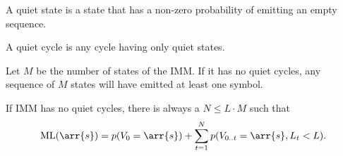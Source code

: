 \begin{definition}
  A quiet state is a state that has a non-zero probability of emitting an empty sequence.
\end{definition}

\begin{definition}
  A quiet cycle is any cycle having only quiet states.
\end{definition}

\begin{corollary}
  Let $M$ be the number of states of the IMM. If it has no quiet cycles, any sequence of $M$ states
  will have emitted at least one symbol.
\end{corollary}

If IMM has no quiet cycles, there is always a $N \leq L\cdot M$ such that
\begin{align*}
  \mathrm{ML}(\arr{s}) = p(V_0=\arr{s}) + \sum_{t=1}^N p(V_{0..t}=\arr{s}, L_t<L).
\end{align*}
